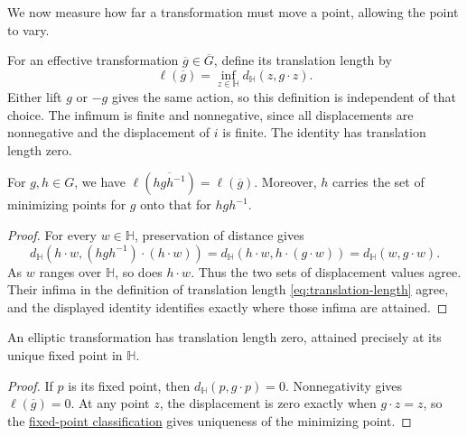 We now measure how far a transformation must move a point, allowing the point to vary.

\begin{definition}\label{hyperbolic.translation-length}
For an effective transformation $\overline g\in\overline G$, define its translation length by
\begin{equation}\label{eq:translation-length}
 \ell(\overline g)=\inf_{z\in\mathbb H}d_{\mathbb H}(z,g\cdot z).
\end{equation}
Either lift $g$ or $-g$ gives the same action, so this definition is independent of that choice. The infimum is finite and nonnegative, since all displacements are nonnegative and the displacement of $i$ is finite. The identity has translation length zero.
\end{definition}

\begin{lemma}\label{hyperbolic.translation-length-conjugacy}
For $g,h\in G$, we have $\ell(\overline{hgh^{-1}})=\ell(\overline g)$. Moreover, $h$ carries the set of minimizing points for $g$ onto that for $hgh^{-1}$.
\end{lemma}

\begin{proof}
For every $w\in\mathbb H$, preservation of distance gives
\[
 d_{\mathbb H}(h\cdot w,(hgh^{-1})\cdot(h\cdot w))
 =d_{\mathbb H}(h\cdot w,h\cdot(g\cdot w))
 =d_{\mathbb H}(w,g\cdot w).
\]
As $w$ ranges over $\mathbb H$, so does $h\cdot w$. Thus the two sets of displacement values agree. Their infima in the definition of translation length \eqref{eq:translation-length} agree, and the displayed identity identifies exactly where those infima are attained.
\end{proof}

\begin{proposition}\label{hyperbolic.elliptic-length}
An elliptic transformation has translation length zero, attained precisely at its unique fixed point in $\mathbb H$.
\end{proposition}

\begin{proof}
If $p$ is its fixed point, then $d_{\mathbb H}(p,g\cdot p)=0$. Nonnegativity gives $\ell(\overline g)=0$. At any point $z$, the displacement is zero exactly when $g\cdot z=z$, so the \hyperref[hyperbolic.fixed-point-classification]{fixed-point classification} gives uniqueness of the minimizing point.
\end{proof}

